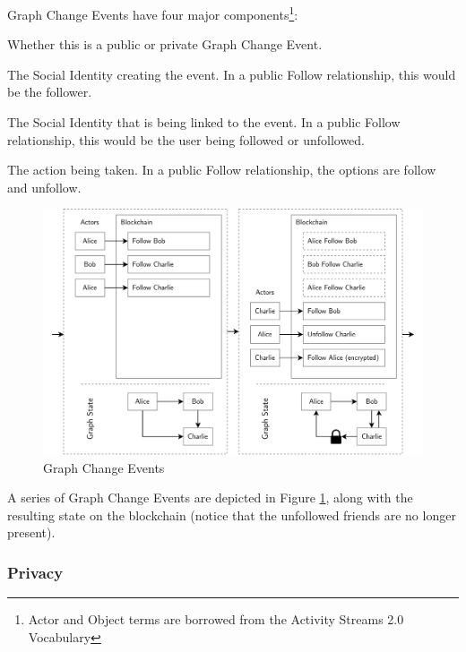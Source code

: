 \documentclass[12pt,letterpaper]{article}
\providecommand{\tightlist}{%
\setlength{\itemsep}{0pt}\setlength{\parskip}{0pt}}
\begin{document}
\begin{samepage}
	Graph Change Events have four major components\footnote{Actor and Object terms are borrowed from the Activity Streams 2.0 Vocabulary\cite{activitypub}}:

	\begin{description}
		\tightlist
		\item[Type:]
		      Whether this is a public or private Graph Change Event.
		\item[Actor:]
		      The Social Identity creating the event. In a public Follow relationship, this would be the follower.
		\item[Object:]
		      The Social Identity that is being linked to the event. In a public Follow relationship, this would be the user being followed or unfollowed.
		\item[Action:]
		      The action being taken. In a public Follow relationship, the options are follow and unfollow.
	\end{description}
\end{samepage}

\begin{figure}
	\includegraphics[width=\linewidth]{figures/Graph Change Events.png}
	\caption{Graph Change Events}
	\label{fig:3}
\end{figure}

A series of Graph Change Events are depicted in Figure \ref{fig:3}, along with the
resulting state on the blockchain (notice that the unfollowed friends are no longer
present).

\subsubsection{Privacy}
\end{document}
